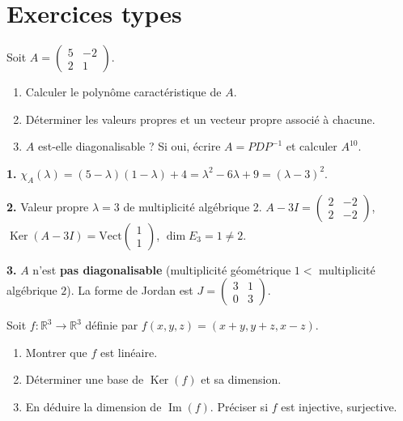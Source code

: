 \documentclass[11pt,a4paper,twoside]{book}
\newcommand{\R}{\mathbb{R}}
\DeclareMathOperator{\Im}{Im}
\DeclareMathOperator{\Ker}{Ker}
\begin{document}
\section{Exercices types}

\begin{exercicebox}
Soit $A = \begin{pmatrix} 5 & -2 \\ 2 & 1 \end{pmatrix}$.
\begin{enumerate}
  \item Calculer le polynôme caractéristique de $A$.
  \item Déterminer les valeurs propres et un vecteur propre associé à chacune.
  \item $A$ est-elle diagonalisable ? Si oui, écrire $A = PDP^{-1}$ et calculer $A^{10}$.
\end{enumerate}
\end{exercicebox}

\begin{correctionbox}[Correction]
\textbf{1.} $\chi_A(\lambda) = (5-\lambda)(1-\lambda)+4 = \lambda^2 - 6\lambda + 9 = (\lambda-3)^2$.

\textbf{2.} Valeur propre $\lambda = 3$ de multiplicité algébrique 2.
$A - 3I = \begin{pmatrix}2&-2\\2&-2\end{pmatrix}$, $\Ker(A-3I) = \mathrm{Vect}\begin{pmatrix}1\\1\end{pmatrix}$, $\dim E_3 = 1 \neq 2$.

\textbf{3.} $A$ n'est \textbf{pas diagonalisable} (multiplicité géométrique $1 <$ multiplicité algébrique $2$). La forme de Jordan est $J = \begin{pmatrix}3&1\\0&3\end{pmatrix}$.
\end{correctionbox}

\begin{exercicebox}
Soit $f : \R^3 \to \R^3$ définie par $f(x,y,z) = (x+y, y+z, x-z)$.
\begin{enumerate}
  \item Montrer que $f$ est linéaire.
  \item Déterminer une base de $\Ker(f)$ et sa dimension.
  \item En déduire la dimension de $\Im(f)$. Préciser si $f$ est injective, surjective.
\end{enumerate}
\end{exercicebox}
\end{document}
